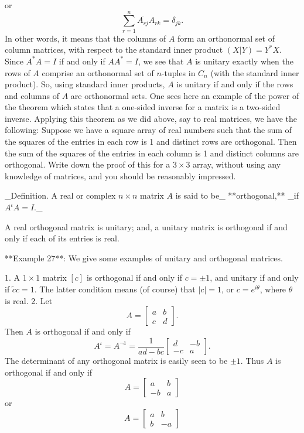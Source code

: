 or \[\sum_{r=1}^{n}\overline{A_{rj}}A_{rk}=\delta_{jk}.\] In other words, it means that the columns of \(A\) form an orthonormal set of column matrices, with respect to the standard inner product \((X|Y)=Y^{*}X\). Since \(A^{*}A=I\) if and only if \(AA^{*}=I\), we see that \(A\) is unitary exactly when the rows of \(A\) comprise an orthonormal set of \(n\)-tuples in \(C_{n}\) (with the standard inner product). So, using standard inner products, \(A\) is unitary if and only if the rows and columns of \(A\) are orthonormal sets. One sees here an example of the power of the theorem which states that a one-sided inverse for a matrix is a two-sided inverse. Applying this theorem as we did above, say to real matrices, we have the following: Suppose we have a square array of real numbers such that the sum of the squares of the entries in each row is 1 and distinct rows are orthogonal. Then the sum of the squares of the entries in each column is 1 and distinct columns are orthogonal. Write down the proof of this for a \(3\times 3\) array, without using any knowledge of matrices, and you should be reasonably impressed.

_Definition. A real or complex \(n\times n\) matrix \(A\) is said to be_ **orthogonal,** _if \(A^{\iota}A=I\)._

A real orthogonal matrix is unitary; and, a unitary matrix is orthogonal if and only if each of its entries is real.

**Example 27**: We give some examples of unitary and orthogonal matrices.

1. A \(1\times 1\) matrix \([c]\) is orthogonal if and only if \(c=\pm 1\), and unitary if and only if \(\tilde{c}c=1\). The latter condition means (of course) that \(|c|=1\), or \(c=e^{i\theta}\), where \(\theta\) is real.
2. Let \[A=\begin{bmatrix}a&b\\ c&d\end{bmatrix}.\] Then \(A\) is orthogonal if and only if \[A^{\iota}=A^{\neg 1}=\frac{1}{ad-bc}\begin{bmatrix}d&-b\\ -c&a\end{bmatrix}.\] The determinant of any orthogonal matrix is easily seen to be \(\pm 1\). Thus \(A\) is orthogonal if and only if \[A=\begin{bmatrix}a&b\\ -b&a\end{bmatrix}\] or \[A=\begin{bmatrix}a&b\\ b&-a\end{bmatrix}\] 